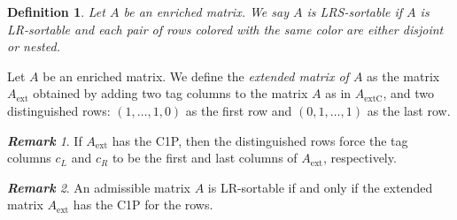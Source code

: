 \documentclass[a4paper,10pt]{report}
\theoremstyle{plain}
\theoremstyle{remark}
\newtheorem{remark}{\textbf{\textit{Remark}}}[chapter]
\theoremstyle{plain}
\newtheorem{defn}{Definition}[chapter]
\newcommand*{\ext}{\mathrm{ext}}
\newcommand*{\extC}{\mathrm{extC}}
\begin{document}
\begin{defn}
	Let $A$ be an enriched matrix. We say $A$ is \emph{LRS-sortable} if $A$ is LR-sortable and each pair of rows colored with the same color are either disjoint or nested.
\end{defn}


Let $A$ be an enriched matrix. We define the \emph{extended matrix of $A$} as the matrix $A_{\ext}$ obtained by adding two tag columns to the matrix $A$ as in $A_{\extC}$, and two distinguished rows: $(1, \ldots, 1, 0)$ as the first row and $(0, 1, \ldots, 1)$ as the last row.


\begin{remark}
	If $A_{\ext}$ has the C1P, then the distinguished rows force the tag columns $c_L$ and $c_R$ to be the first and last columns of $A_{\ext}$, respectively.
\end{remark}

\begin{remark}
	An admissible matrix $A$ is LR-sortable if and only if the extended matrix $A_{\ext}$ has the C1P for the rows.
\end{remark}
\end{document}
